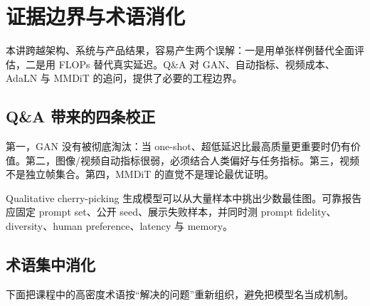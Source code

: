 \documentclass[a4paper]{article}
\begin{document}
\section{证据边界与术语消化}

本讲跨越架构、系统与产品结果，容易产生两个误解：一是用单张样例替代全面评估，二是用 FLOPs 替代真实延迟。Q\&A 对 GAN、自动指标、视频成本、AdaLN 与 MMDiT 的追问，提供了必要的工程边界。

\subsection{Q\&A 带来的四条校正}

第一，GAN 没有被彻底淘汰：当 one-shot、超低延迟比最高质量更重要时仍有价值。第二，图像/视频自动指标很弱，必须结合人类偏好与任务指标。第三，视频不是独立帧集合。第四，MMDiT 的直觉不是理论最优证明。



\begin{warningbox}{Qualitative cherry-picking}
生成模型可以从大量样本中挑出少数最佳图。可靠报告应固定 prompt set、公开 seed、展示失败样本，并同时测 prompt fidelity、diversity、human preference、latency 与 memory。
\end{warningbox}

\subsection{术语集中消化}

下面把课程中的高密度术语按“解决的问题”重新组织，避免把模型名当成机制。
\end{document}
